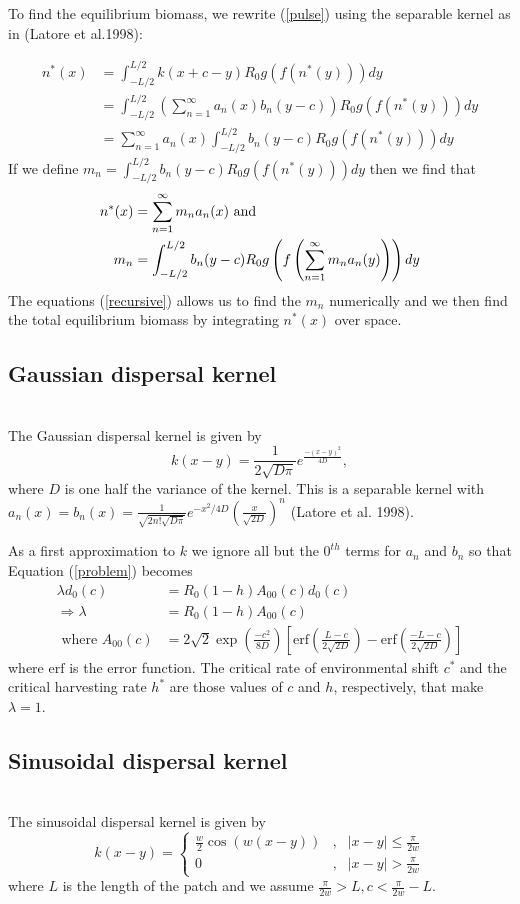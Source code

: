 \documentclass[12pt,english]{article}
\begin{document}
To find the equilibrium biomass, we rewrite (\ref{pulse}) using the separable kernel as in (Latore et al.1998):

\begin{align*}
 n^*(x)&=\int_{-L/2}^{L/2}k(x+c-y)R_0g(f(n^*(y)))dy
 \\&= \int_{-L/2}^{L/2}\left(\sum_{n=1}^\infty a_n(x)b_n(y-c)\right)R_0g(f(n^*(y)))dy
  \\&=\sum_{n=1}^\infty a_n(x) \int_{-L/2}^{L/2}b_n(y-c)R_0g(f(n^*(y)))dy
\end{align*}
If we define $m_n=\int_{-L/2}^{L/2}b_n(y-c)R_0g(f(n^*(y)))dy$ then we find that 
\begin{align}
n^*(x)&=\sum_{n=1}^\infty m_na_n(x) \text { and } \notag
\\m_n&=\int_{-L/2}^{L/2}b_n(y-c)R_0g\left(f\left(\sum_{n=1}^\infty m_na_n(y)\right)\right)dy \label{recursive}
\end{align}
The equations (\ref{recursive}) allows us to find the $m_n$ numerically and we then find the total equilibrium biomass by integrating $n^*(x)$ over space.

\subsection{Gaussian dispersal kernel \label{gausapp}}
~\\The Gaussian dispersal kernel is given by
$$k(x-y)=\frac{1}{2\sqrt{D\pi}}e^{\frac{-(x-y)^2}{4D}},$$
where $D$ is one half the variance of the kernel.
This is a separable kernel with
$a_n(x)=b_n(x)=\frac{1}{\sqrt{2n!\sqrt{D\pi}}}e^{-x^2/4D}\left(\frac{x}{\sqrt{2D}}\right)^n$ (Latore et al. 1998).

As a first approximation to $k$ we ignore all but the $0^{th}$ terms for $a_n$ and $b_n$ so that Equation (\ref{problem}) becomes
\begin{align*}
\lambda d_0(c)&=R_0(1-h)A_{00}(c)d_0(c)
\\ \Rightarrow \lambda&=R_0(1-h)A_{00}(c)
\\\text{ where } A_{00}(c)&=2\sqrt{2}\exp\left(\frac{-c^2}{8D}\right)\left[\text{erf}\left(\frac{L-c}{2\sqrt{2D}}\right)-\text{erf}\left(\frac{-L-c}{2\sqrt{2D}}\right)\right]
\end{align*}
where $\text{erf}$ is the error function.  The critical rate of environmental shift $c^*$ and the critical harvesting rate $h^*$ are those values of $c$ and $h$, respectively, that make $\lambda=1$.

\subsection{Sinusoidal dispersal kernel \label{sinapp}}
~\\The sinusoidal dispersal kernel is given by 
$$k(x-y)=\left\{\begin{array}{ccccc}
\frac{w}{2}\cos(w(x-y)) & , & |x-y|\leq\frac{\pi}{2w}
\\ 0 & , & |x-y|>\frac{\pi}{2w}
\end{array}\right.
$$
where $L$ is the length of the patch and we assume $\frac{\pi}{2w}>L,c<\frac{\pi}{2w}-L$.
\end{document}
